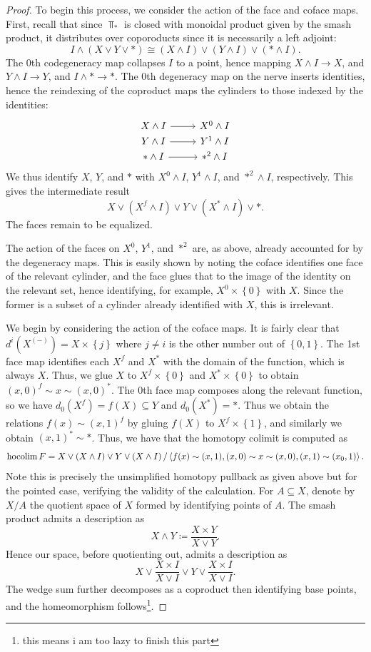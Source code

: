 \begin{proof}
	To begin this process, we consider the action of the face and coface maps. First, recall that since $\Top _*$ is closed with monoidal product given by the smash product, it distributes over coporoducts since it is necessarily a left adjoint:
	\[
		I\wedge(X\vee Y\vee*)\cong (X\wedge I)\vee(Y\wedge I)\vee(*\wedge I)
	.\]
	The $0$th codegeneracy map collapses $I$ to a point, hence mapping $X\wedge I\to X$, and $Y\wedge I\to Y$, and $I\wedge *\to *$. The 0th degeneracy map on the nerve inserts identities, hence the reindexing of the coproduct maps the cylinders to those indexed by the identities:
	\[\begin{tikzcd}[row sep = 0em, column sep = 2.5em]
	X\wedge I\ar[r]  & X^0\wedge I \\
	Y\wedge I\ar[r]  & Y^1\wedge I \\
	*\wedge I\ar[r]  & *^2\wedge I
	\end{tikzcd}\]
	We thus identify $X$, $Y$, and $*$ with $X^0\wedge I$, $Y^1\wedge I$, and $*^2\wedge I$, respectively. This gives the intermediate result
	\[
		 X\vee \left( X^f\wedge I \right) \vee Y \vee \left( X^*\wedge I \right) \vee *
	.\]
	The faces remain to be equalized.

	The action of the faces on $X^0$, $Y^1$, and $*^2$ are, as above, already accounted for by the degeneracy maps. This is easily shown by noting the coface identifies one face of the relevant cylinder, and the face glues that to the image of the identity on the relevant set, hence identifying, for example, $X^0\times \left\{ 0 \right\} $ with $X$. Since the former is a subset of a cylinder already identified with $X$, this is irrelevant.

	We begin by considering the action of the coface maps. It is fairly clear that $d^i(X^{(-)} )=X\times \left\{ j \right\} $ where $j\neq i$ is the other number out of $\left\{ 0,1 \right\} $. The 1st face map identifies each $X^f$ and $X^*$ with the domain of the function, which is always $X$. Thus, we glue $X$ to $X^f\times \left\{ 0 \right\} $ and $X^*\times \left\{ 0 \right\} $ to obtain $(x,0)^f\sim x\sim (x,0)^*$. The 0th face map composes along the relevant function, so we have $d_0(X^f)=f(X)\subseteq Y$ and $d_0(X^*)=*$. Thus we obtain the relations $f(x)\sim (x,1)^f$ by gluing $f(X)$ to $X^f\times \left\{ 1 \right\} $, and similarly we obtain $(x,1)^*\sim *$. Thus, we have that the homotopy colimit is computed as
	\[
		\operatorname*{hocolim} F=X\vee\left( X\wedge I \right) \vee Y\vee \left( X\wedge I \right) / \left\langle f(x)\sim (x,1),(x,0)\sim x\sim (x,0),(x,1)\sim (x_0,1) \right\rangle 
	.\]
	Note this is precisely the unsimplified homotopy pullback as given above but for the pointed case, verifying the validity of the calculation. For $A\subseteq X$, denote by $X/A$ the quotient space of $X$ formed by identifying points of $A$. The smash product admits a description as
	\[
		X\wedge Y \coloneqq \frac{X\times Y}{X\vee Y} 
	.\]
	Hence our space, before quotienting out, admits a description as
	\[
		X\vee \frac{X\times I}{X\vee I} \vee Y \vee \frac{X\times I}{X\vee I} 
	.\]
	The wedge sum further decomposes as a coproduct then identifying base points, and the homeomorphism follows\footnote{this means i am too lazy to finish this part}.


\end{proof}

